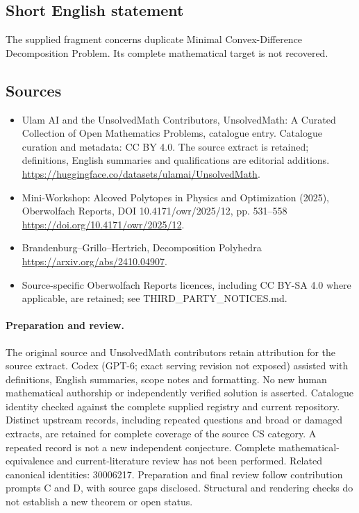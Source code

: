 \documentclass[11pt]{article}
\begin{document}
\subsection{Short English statement}
The supplied fragment concerns duplicate Minimal Convex-Difference Decomposition Problem. Its complete mathematical target is not recovered.
\subsection{Sources}
\begin{itemize}
\item[S1] Ulam AI and the UnsolvedMath Contributors, UnsolvedMath: A Curated Collection of Open Mathematics Problems, catalogue entry. Catalogue curation and metadata: CC BY 4.0. The source extract is retained; definitions, English summaries and qualifications are editorial additions.
\url{https://huggingface.co/datasets/ulamai/UnsolvedMath}.
\item[S2] Mini-Workshop: Alcoved Polytopes in Physics and Optimization (2025), Oberwolfach Reports, DOI 10.4171/owr/2025/12, pp. 531--558
\url{https://doi.org/10.4171/owr/2025/12}.
\item[S3] Brandenburg--Grillo--Hertrich, Decomposition Polyhedra
\url{https://arxiv.org/abs/2410.04907}.
\item Source-specific Oberwolfach Reports licences, including CC BY-SA 4.0 where applicable, are retained; see THIRD\_PARTY\_NOTICES.md.
\end{itemize}
\paragraph{Preparation and review.}
The original source and UnsolvedMath contributors retain attribution for the source extract. Codex (GPT-6; exact serving revision not exposed) assisted with definitions, English summaries, scope notes and formatting. No new human mathematical authorship or independently verified solution is asserted. Catalogue identity checked against the complete supplied registry and current repository. Distinct upstream records, including repeated questions and broad or damaged extracts, are retained for complete coverage of the source CS category. A repeated record is not a new independent conjecture. Complete mathematical-equivalence and current-literature review has not been performed. Related canonical identities: 30006217. Preparation and final review follow contribution prompts C and D, with source gaps disclosed. Structural and rendering checks do not establish a new theorem or open status.
\label{end:statement}
\end{document}
